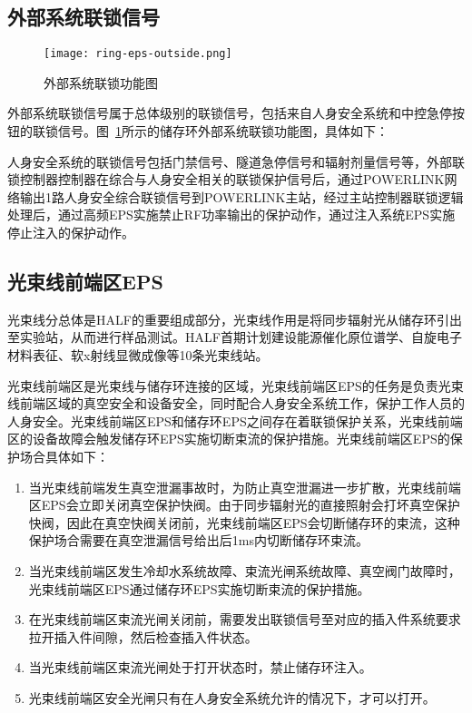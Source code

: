 \subsection{外部系统联锁信号}

\begin{figure}[!htb]
	\centering
	\texttt{[image: ring-eps-outside.png]}
	\caption{外部系统联锁功能图}
	\label{fig:ring-eps-outside}
\end{figure}

外部系统联锁信号属于总体级别的联锁信号，包括来自人身安全系统和中控急停按钮的联锁信号。图~\ref{fig:ring-eps-outside}所示的储存环外部系统联锁功能图，具体如下：

人身安全系统的联锁信号包括门禁信号、隧道急停信号和辐射剂量信号等，外部联锁控制器控制器在综合与人身安全相关的联锁保护信号后，通过POWERLINK网络输出1路人身安全综合联锁信号到POWERLINK主站，经过主站控制器联锁逻辑处理后，通过高频EPS实施禁止RF功率输出的保护动作，通过注入系统EPS实施停止注入的保护动作。

\subsection{光束线前端区EPS}

光束线分总体是HALF的重要组成部分，光束线作用是将同步辐射光从储存环引出至实验站，从而进行样品测试。HALF首期计划建设能源催化原位谱学、自旋电子材料表征、软x射线显微成像等10条光束线站。

光束线前端区是光束线与储存环连接的区域，光束线前端区EPS的任务是负责光束线前端区域的真空安全和设备安全，同时配合人身安全系统工作，保护工作人员的人身安全。光束线前端区EPS和储存环EPS之间存在着联锁保护关系，光束线前端区的设备故障会触发储存环EPS实施切断束流的保护措施。光束线前端区EPS的保护场合具体如下：

\begin{enumerate}
  \item 当光束线前端发生真空泄漏事故时，为防止真空泄漏进一步扩散，光束线前端区EPS会立即关闭真空保护快阀。由于同步辐射光的直接照射会打坏真空保护快阀，因此在真空快阀关闭前，光束线前端区EPS会切断储存环的束流，这种保护场合需要在真空泄漏信号给出后1ms内切断储存环束流。

  \item 当光束线前端区发生冷却水系统故障、束流光闸系统故障、真空阀门故障时，光束线前端区EPS通过储存环EPS实施切断束流的保护措施。

  \item 在光束线前端区束流光闸关闭前，需要发出联锁信号至对应的插入件系统要求拉开插入件间隙，然后检查插入件状态。

  \item 当光束线前端区束流光闸处于打开状态时，禁止储存环注入。

  \item 光束线前端区安全光闸只有在人身安全系统允许的情况下，才可以打开。
\end{enumerate}

